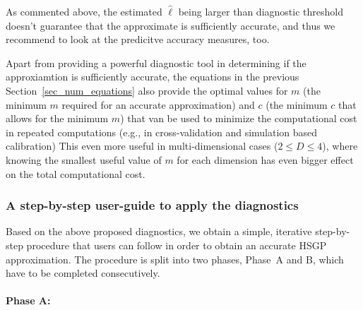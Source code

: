 As commented above, the estimated $\hat{\ell}$ being larger than diagnostic threshold doesn't guarantee that the approximate is sufficiently accurate, and thus we recommend to look at the predicitve accuracy measures, too.

Apart from providing a powerful diagnostic tool in determining if the approxiamtion is sufficiently accurate, the equations in the previous Section~\ref{sec_num_equations} also provide the optimal values for $m$ (the minimum $m$ required for an accurate approximation) and $c$ (the minimum $c$ that allows for the minimum $m$) that van be used to minimize the computational cost in repeated computations (e.g., in cross-validation and simulation based calibration)
This even more useful in multi-dimensional cases ($2 \leq D \leq 4$), where knowing the smallest useful value of $m$ for each dimension has even bigger effect on the total computational cost.

\subsubsection{A step-by-step user-guide to apply the diagnostics} \label{sec_user_guide}

Based on the above proposed diagnostics, we obtain a simple, iterative step-by-step procedure that users can follow in order to obtain an accurate HSGP approximation. The procedure is split into two phases, Phase~A and B, which have to be completed consecutively.

\paragraph*{Phase A:}


